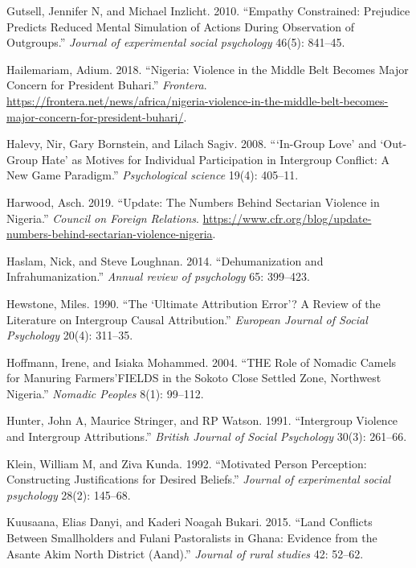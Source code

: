 \documentclass[11pt]{article}
\begin{document}
\hypertarget{ref-gutsell2010empathy}{}
Gutsell, Jennifer N, and Michael Inzlicht. 2010. ``Empathy Constrained:
Prejudice Predicts Reduced Mental Simulation of Actions During
Observation of Outgroups.'' \emph{Journal of experimental social
psychology} 46(5): 841--45.

\hypertarget{ref-frontera2018nigeria}{}
Hailemariam, Adium. 2018. ``Nigeria: Violence in the Middle Belt Becomes
Major Concern for President Buhari.'' \emph{Frontera}.
\url{https://frontera.net/news/africa/nigeria-violence-in-the-middle-belt-becomes-major-concern-for-president-buhari/}.

\hypertarget{ref-halevy2008group}{}
Halevy, Nir, Gary Bornstein, and Lilach Sagiv. 2008. ```In-Group Love'
and `Out-Group Hate' as Motives for Individual Participation in
Intergroup Conflict: A New Game Paradigm.'' \emph{Psychological science}
19(4): 405--11.

\hypertarget{ref-council2019nigeria}{}
Harwood, Asch. 2019. ``Update: The Numbers Behind Sectarian Violence in
Nigeria.'' \emph{Council on Foreign Relations}.
\url{https://www.cfr.org/blog/update-numbers-behind-sectarian-violence-nigeria}.

\hypertarget{ref-haslam2014dehumanization}{}
Haslam, Nick, and Steve Loughnan. 2014. ``Dehumanization and
Infrahumanization.'' \emph{Annual review of psychology} 65: 399--423.

\hypertarget{ref-hewstone1990ultimate}{}
Hewstone, Miles. 1990. ``The `Ultimate Attribution Error'? A Review of
the Literature on Intergroup Causal Attribution.'' \emph{European
Journal of Social Psychology} 20(4): 311--35.

\hypertarget{ref-hoffmann2004role}{}
Hoffmann, Irene, and Isiaka Mohammed. 2004. ``THE Role of Nomadic Camels
for Manuring Farmers'FIELDS in the Sokoto Close Settled Zone, Northwest
Nigeria.'' \emph{Nomadic Peoples} 8(1): 99--112.

\hypertarget{ref-hunter1991intergroup}{}
Hunter, John A, Maurice Stringer, and RP Watson. 1991. ``Intergroup
Violence and Intergroup Attributions.'' \emph{British Journal of Social
Psychology} 30(3): 261--66.

\hypertarget{ref-klein1992motivated}{}
Klein, William M, and Ziva Kunda. 1992. ``Motivated Person Perception:
Constructing Justifications for Desired Beliefs.'' \emph{Journal of
experimental social psychology} 28(2): 145--68.

\hypertarget{ref-kuusaana2015land}{}
Kuusaana, Elias Danyi, and Kaderi Noagah Bukari. 2015. ``Land Conflicts
Between Smallholders and Fulani Pastoralists in Ghana: Evidence from the
Asante Akim North District (Aand).'' \emph{Journal of rural studies} 42:
52--62.
\end{document}

